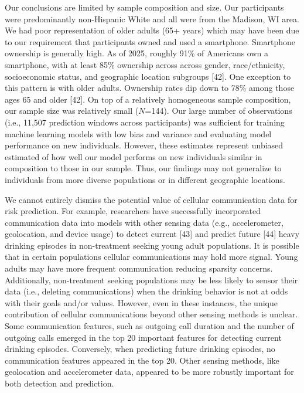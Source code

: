 \documentclass[
  letterpaper,
  DIV=11,
  numbers=noendperiod]{scrartcl}
\begin{document}
Our conclusions are limited by sample composition and size. Our
participants were predominantly non-Hispanic White and all were from the
Madison, WI area. We had poor representation of older adults (65+ years)
which may have been due to our requirement that participants owned and
used a smartphone. Smartphone ownership is generally high. As of 2025,
roughly 91\% of Americans own a smartphone, with at least 85\% ownership
across across gender, race/ethnicity, socioeconomic status, and
geographic location subgroups {[}42{]}. One exception to this pattern is
with older adults. Ownership rates dip down to 78\% among those ages 65
and older {[}42{]}. On top of a relatively homogeneous sample
composition, our sample size was relatively small (\(N\)=144). Our large
number of observations (i.e., 11,507 prediction windows across
participants) was sufficient for training machine learning models with
low bias and variance and evaluating model performance on new
individuals. However, these estimates represent unbiased estimated of
how well our model performs on new individuals similar in composition to
those in our sample. Thus, our findings may not generalize to
individuals from more diverse populations or in different geographic
locations.

We cannot entirely dismiss the potential value of cellular communication
data for risk prediction. For example, researchers have successfully
incorporated communication data into models with other sensing data
(e.g., accelerometer, geolocation, and device usage) to detect current
{[}43{]} and predict future {[}44{]} heavy drinking episodes in
non-treatment seeking young adult populations. It is possible that in
certain populations cellular communications may hold more signal. Young
adults may have more frequent communication reducing sparsity concerns.
Additionally, non-treatment seeking populations may be less likely to
sensor their data (i.e., deleting communications) when the drinking
behavior is not at odds with their goals and/or values. However, even in
these instances, the unique contribution of cellular communications
beyond other sensing methods is unclear. Some communication features,
such as outgoing call duration and the number of outgoing calls emerged
in the top 20 important features for detecting current drinking
episodes. Conversely, when predicting future drinking episodes, no
communication features appeared in the top 20. Other sensing methods,
like geolocation and accelerometer data, appeared to be more robustly
important for both detection and prediction.
\end{document}
